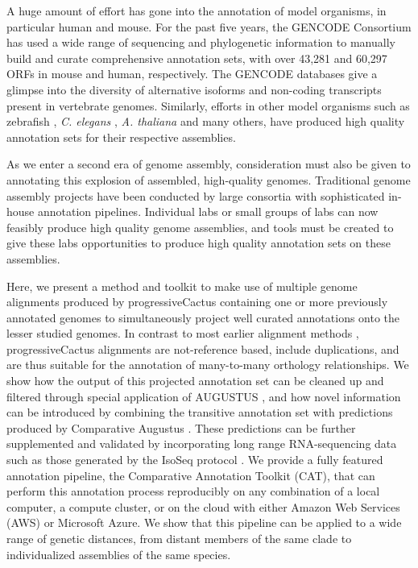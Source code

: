 \documentclass[fleqn,10pt]{wlscirep}
\begin{document}
A huge amount of effort has gone into the annotation of model organisms, in particular human and mouse. For the past five years, the GENCODE Consortium \cite{harrow2012gencode} has used a wide range of sequencing and phylogenetic information to manually build and curate comprehensive annotation sets, with over 43,281 and 60,297 ORFs in mouse and human, respectively. The GENCODE databases give a glimpse into the diversity of alternative isoforms and non-coding transcripts present in vertebrate genomes. Similarly, efforts in other model organisms such as zebrafish \cite{westerfield1998zebrafish}, \textit{C. elegans} \cite{stein2001wormbase}, \textit{A. thaliana} \cite{swarbreck2008arabidopsis} and many others, have produced high quality annotation sets for their respective assemblies.

As we enter a second era of genome assembly, consideration must also be given to annotating this explosion of assembled, high-quality genomes. Traditional genome assembly projects have been conducted by large consortia with sophisticated in-house annotation pipelines. Individual labs or small groups of labs can now feasibly produce high quality genome assemblies, and tools must be created to give these labs opportunities to produce high quality annotation sets on these assemblies.

Here, we present a method and toolkit to make use of multiple genome alignments produced by progressiveCactus \cite{paten2011cactus} containing one or more previously annotated genomes to simultaneously project well curated annotations onto the lesser studied genomes. In contrast to most earlier alignment methods \cite{blanchette2004aligning,earl2014alignathon,miller200728}, progressiveCactus alignments are not-reference based, include duplications, and are thus suitable for the annotation of many-to-many orthology relationships. We show how the output of this projected annotation set can be cleaned up and filtered through special application of AUGUSTUS \cite{stanke2008using}, and how novel information can be introduced by combining the transitive annotation set with predictions produced by Comparative Augustus \cite{konig2015simultaneous}. These predictions can be further supplemented and validated by incorporating long range RNA-sequencing data such as those generated by the IsoSeq protocol \cite{gordon2015widespread}. We provide a fully featured annotation pipeline, the Comparative Annotation Toolkit (CAT), that can perform this annotation process reproducibly on any combination of a local computer, a compute cluster, or on the cloud with either Amazon Web Services (AWS) or Microsoft Azure. We show that this pipeline can be applied to a wide range of genetic distances, from distant members of the same clade to individualized assemblies of the same species.
\end{document}
